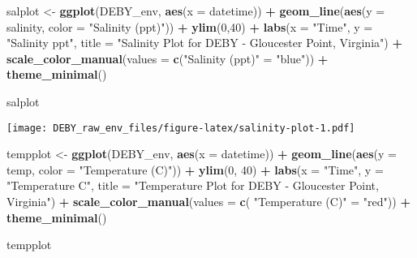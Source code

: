 \documentclass[
]{article}
\newenvironment{Shaded}{\begin{snugshade}}{\end{snugshade}}
\newcommand{\AttributeTok}[1]{\textcolor[rgb]{0.13,0.29,0.53}{#1}}
\newcommand{\DecValTok}[1]{\textcolor[rgb]{0.00,0.00,0.81}{#1}}
\newcommand{\FunctionTok}[1]{\textcolor[rgb]{0.13,0.29,0.53}{\textbf{#1}}}
\newcommand{\NormalTok}[1]{#1}
\newcommand{\OtherTok}[1]{\textcolor[rgb]{0.56,0.35,0.01}{#1}}
\newcommand{\SpecialCharTok}[1]{\textcolor[rgb]{0.81,0.36,0.00}{\textbf{#1}}}
\newcommand{\StringTok}[1]{\textcolor[rgb]{0.31,0.60,0.02}{#1}}
\begin{document}
\begin{Shaded}
\begin{Highlighting}[]
\NormalTok{salplot }\OtherTok{\textless{}{-}} \FunctionTok{ggplot}\NormalTok{(DEBY\_env, }\FunctionTok{aes}\NormalTok{(}\AttributeTok{x =}\NormalTok{ datetime)) }\SpecialCharTok{+}
    \FunctionTok{geom\_line}\NormalTok{(}\FunctionTok{aes}\NormalTok{(}\AttributeTok{y =}\NormalTok{ salinity, }\AttributeTok{color =} \StringTok{"Salinity (ppt)"}\NormalTok{)) }\SpecialCharTok{+}
    \FunctionTok{ylim}\NormalTok{(}\DecValTok{0}\NormalTok{,}\DecValTok{40}\NormalTok{) }\SpecialCharTok{+}
    \FunctionTok{labs}\NormalTok{(}\AttributeTok{x =} \StringTok{"Time"}\NormalTok{, }\AttributeTok{y =} \StringTok{"Salinity ppt"}\NormalTok{, }\AttributeTok{title =} \StringTok{"Salinity Plot for DEBY {-} Gloucester Point, Virginia"}\NormalTok{) }\SpecialCharTok{+}
    \FunctionTok{scale\_color\_manual}\NormalTok{(}\AttributeTok{values =} \FunctionTok{c}\NormalTok{(}\StringTok{"Salinity (ppt)"} \OtherTok{=} \StringTok{"blue"}\NormalTok{)) }\SpecialCharTok{+}
    \FunctionTok{theme\_minimal}\NormalTok{()}


\NormalTok{salplot}
\end{Highlighting}
\end{Shaded}

\texttt{[image: DEBY\_raw\_env\_files/figure-latex/salinity-plot-1.pdf]}

\begin{Shaded}
\begin{Highlighting}[]
\NormalTok{tempplot }\OtherTok{\textless{}{-}} \FunctionTok{ggplot}\NormalTok{(DEBY\_env, }\FunctionTok{aes}\NormalTok{(}\AttributeTok{x =}\NormalTok{ datetime)) }\SpecialCharTok{+}
    \FunctionTok{geom\_line}\NormalTok{(}\FunctionTok{aes}\NormalTok{(}\AttributeTok{y =}\NormalTok{ temp, }\AttributeTok{color =} \StringTok{"Temperature (C)"}\NormalTok{)) }\SpecialCharTok{+}
    \FunctionTok{ylim}\NormalTok{(}\DecValTok{0}\NormalTok{, }\DecValTok{40}\NormalTok{) }\SpecialCharTok{+}
    \FunctionTok{labs}\NormalTok{(}\AttributeTok{x =} \StringTok{"Time"}\NormalTok{, }\AttributeTok{y =} \StringTok{"Temperature C"}\NormalTok{, }\AttributeTok{title =} \StringTok{"Temperature Plot for DEBY {-} Gloucester Point, Virginia"}\NormalTok{) }\SpecialCharTok{+}
    \FunctionTok{scale\_color\_manual}\NormalTok{(}\AttributeTok{values =} \FunctionTok{c}\NormalTok{( }\StringTok{"Temperature (C)"} \OtherTok{=} \StringTok{"red"}\NormalTok{)) }\SpecialCharTok{+}
    \FunctionTok{theme\_minimal}\NormalTok{()}

\NormalTok{tempplot}
\end{Highlighting}
\end{Shaded}
\end{document}
